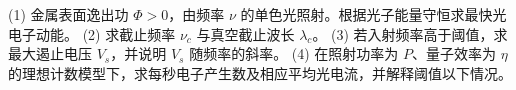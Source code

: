 (1) 金属表面逸出功 \(\Phi>0\)，由频率 \(\nu\) 的单色光照射。根据光子能量守恒求最快光电子动能。
(2) 求截止频率 \(\nu_c\) 与真空截止波长 \(\lambda_c\)。
(3) 若入射频率高于阈值，求最大遏止电压 \(V_s\)，并说明 \(V_s\) 随频率的斜率。
(4) 在照射功率为 \(P\)、量子效率为 \(\eta\) 的理想计数模型下，求每秒电子产生数及相应平均光电流，并解释阈值以下情况。
